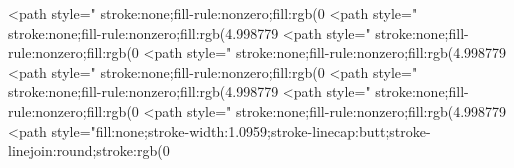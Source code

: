 <path style=" stroke:none;fill-rule:nonzero;fill:rgb(0%
<path style=" stroke:none;fill-rule:nonzero;fill:rgb(4.998779%
<path style=" stroke:none;fill-rule:nonzero;fill:rgb(0%
<path style=" stroke:none;fill-rule:nonzero;fill:rgb(4.998779%
<path style=" stroke:none;fill-rule:nonzero;fill:rgb(0%
<path style=" stroke:none;fill-rule:nonzero;fill:rgb(4.998779%
<path style=" stroke:none;fill-rule:nonzero;fill:rgb(0%
<path style=" stroke:none;fill-rule:nonzero;fill:rgb(4.998779%
<path style="fill:none;stroke-width:1.0959;stroke-linecap:butt;stroke-linejoin:round;stroke:rgb(0%
